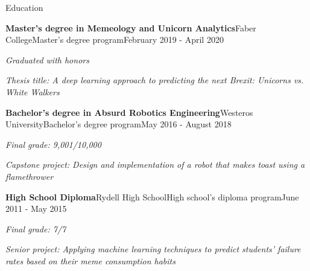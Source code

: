 \documentclass{resume} %
\newcommand{\italicitem}[1]{\item{\textit{#1}}}
\begin{document}


\begin{rSection}{Education}

    \begin{rSubsectionNoBullet}{\bf Master's degree in Memeology and Unicorn Analytics}{Faber College}{Master's degree program}{February 2019 - April 2020}
        \italicitem{Graduated with honors}
        \italicitem{Thesis title: A deep learning approach to predicting the next Brexit: Unicorns vs. White Walkers}
    \end{rSubsectionNoBullet}
    
    \begin{rSubsectionNoBullet}{\bf Bachelor's degree in Absurd Robotics Engineering}{Westeros University}{Bachelor's degree program}{May 2016 - August 2018}
        \italicitem{Final grade: 9,001/10,000}
        \italicitem{Capstone project: Design and implementation of a robot that makes toast using a flamethrower}
    \end{rSubsectionNoBullet}
    
    \begin{rSubsectionNoBullet}{\bf High School Diploma}{Rydell High School}{High school's diploma program}{June 2011 - May 2015}
        \italicitem{Final grade: 7/7}
        \italicitem{Senior project: Applying machine learning techniques to predict students' failure rates based on their meme consumption habits}
    \end{rSubsectionNoBullet}

\end{rSection}

\end{document}
